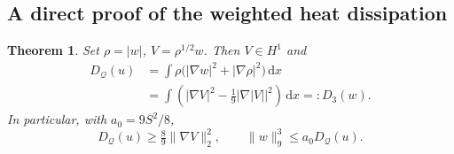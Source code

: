 \documentclass[11pt,a4paper]{article}
\newtheorem{theorem}{Theorem}[section]
\theoremstyle{definition}
\theoremstyle{remark}
\newcommand{\Q}{\mathcal Q}
\newcommand{\dd}{\,\mathrm d}
\newcommand{\norm}[1]{\lVert #1\rVert}
\numberwithin{equation}{section}
\begin{document}
\subsection{A direct proof of the weighted heat dissipation}
\begin{theorem}\label{thm:weighted}
Set \(\rho=|w|\), \(V=\rho^{1/2}w\). Then \(V\in H^1\) and
\begin{align}
D_{\Q}(u)
&=\int\rho\bigl(|\nabla w|^2+|\nabla\rho|^2\bigr)\dd x\label{eq:Dweighted}\\
&=\int\left(|\nabla V|^2-\tfrac19|\nabla|V||^2\right)\dd x=:D_3(w).
\label{eq:DV}
\end{align}
In particular, with \(a_0=9S^2/8\),
\begin{equation}\label{eq:Dcoercive}
D_{\Q}(u)\ge\tfrac89\norm{\nabla V}_2^2,
\qquad \norm w_9^3\le a_0D_{\Q}(u).
\end{equation}
\end{theorem}
\end{document}
